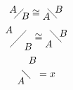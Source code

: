\documentclass{article}
\begin{document}
\[
    \faktor{A}{B} \cong \cofaktor{A}{B}
\] 
\[
    \faktor{A}[1]{B}[-1.5] \cong \cofaktor{A}[-1]{B}[0.5]
\] 
\[
    \cofaktor*{A}[-1]{B}[2]  = x
\]
\end{document}
